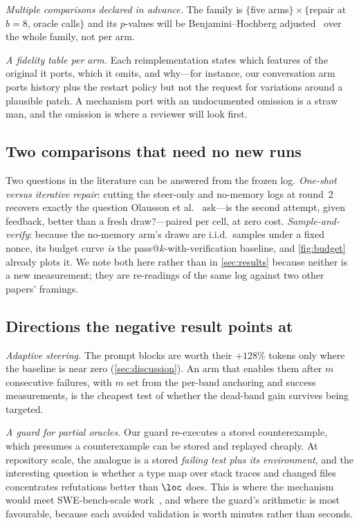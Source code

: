 \emph{Multiple comparisons declared in advance.} The family is
$\{$five arms$\} \times \{$repair at $b{=}8$, oracle calls$\}$ and its
$p$-values will be Benjamini--Hochberg adjusted~\cite{benjamini1995fdr}
over the whole family, not per arm.

\emph{A fidelity table per arm.} Each reimplementation states which features of
the original it ports, which it omits, and why---for instance, our
conversation arm ports history plus the restart policy but not the request for
variations around a plausible patch. A mechanism port with an undocumented
omission is a straw man, and the omission is where a reviewer will look first.

\subsection{Two comparisons that need no new runs}
Two questions in the literature can be answered from the frozen log.
\emph{One-shot versus iterative repair}: cutting the steer-only and no-memory
logs at round~2 recovers exactly the question
Olausson et al.~\cite{olausson2024selfrepair} ask---is the second attempt, given feedback,
better than a fresh draw?---paired per cell, at zero cost.
\emph{Sample-and-verify}: because the no-memory arm's draws are i.i.d.\ samples
under a fixed nonce, its budget curve \emph{is} the pass@$k$-with-verification
baseline, and \cref{fig:budget} already plots it. We note both here rather than
in \cref{sec:results} because neither is a new measurement; they are
re-readings of the same log against two other papers' framings.

\subsection{Directions the negative result points at}
\emph{Adaptive steering.} The prompt blocks are worth their $+128\%$ tokens
only where the baseline is near zero (\cref{sec:discussion}). An arm that
enables them after $m$ consecutive failures, with $m$ set from the per-band
anchoring and success measurements, is the cheapest test of whether the
dead-band gain survives being targeted.

\emph{A guard for partial oracles.} Our guard re-executes a stored
counterexample, which presumes a counterexample can be stored and replayed
cheaply. At repository scale, the analogue is a stored \emph{failing test plus
its environment}, and the interesting question is whether a type map over stack
traces and changed files concentrates refutations better than $\loc$ does. This is where the
mechanism would meet SWE-bench-scale work~\cite{jimenez2024swebench,%
yang2024sweagent,xia2025agentless}, and where the guard's arithmetic is
most favourable, because each avoided validation is worth minutes rather than
seconds.

